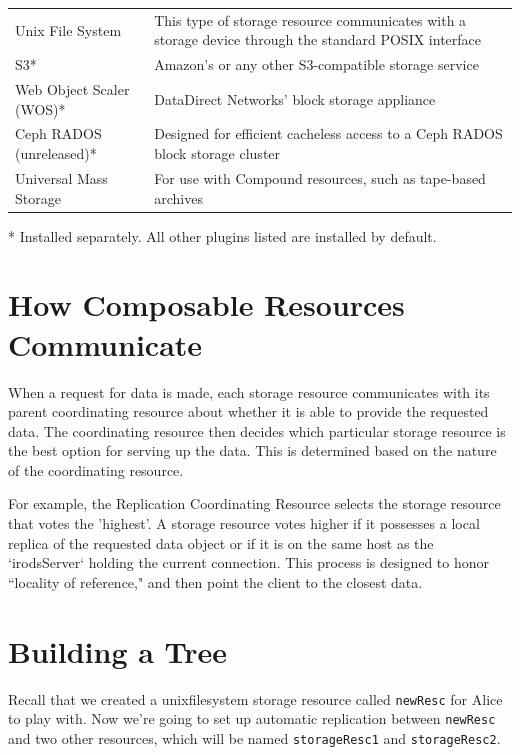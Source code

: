 \documentclass[10pt,oneside]{memoir}
\begin{document}
\begin{center}
\def\arraystretch{1.5}%
\begin{tabular}{ |l|p{10cm}| }
\hline
Unix File System & This type of storage resource communicates with a storage device through the standard POSIX interface \\
S3* & Amazon's or any other S3-compatible storage service \\
Web Object Scaler (WOS)* & DataDirect Networks' block storage appliance \\
Ceph RADOS (unreleased)* & Designed for efficient cacheless access to a Ceph RADOS block storage cluster \\
Universal Mass Storage & For use with Compound resources, such as tape-based archives \\
\hline
\end{tabular}
\end{center}
\footnotesize\vspace{-5mm}\hspace{3mm}* Installed separately. All other plugins listed are installed by default.
\normalsize

\section{How Composable Resources Communicate}

When a request for data is made, each storage resource communicates with its parent coordinating resource about whether it is able to provide the requested data. The coordinating resource then decides which particular storage resource is the best option for serving up the data. This is determined based on the nature of the coordinating resource.

For example, the Replication Coordinating Resource selects the storage resource that votes the 'highest'.  A storage resource votes higher if it possesses a local replica of the requested data object or if it is on the same host as the `irodsServer` holding the current connection. This process is designed to honor ``locality of reference," and then point the client to the closest data.

\section{Building a Tree}

Recall that we created a unixfilesystem storage resource called \texttt{newResc} for Alice to play with. Now we're going to set up automatic replication between \texttt{newResc} and two other resources, which will be named \texttt{storageResc1} and \texttt{storageResc2}.
\end{document}
